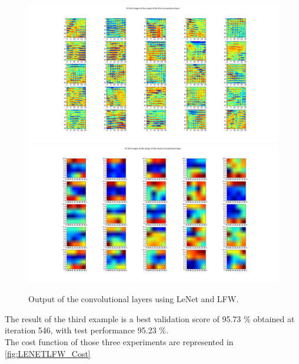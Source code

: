 \begin{figure}[htb]
\centering
\includegraphics[width=1.4\textwidth]{images/LFW_layers/conv_0_out.png}
\includegraphics[width=1.4\textwidth]{images/LFW_layers/conv_1_out.png}
\caption{Output of the convolutional layers using LeNet and LFW.} \label{fig:LENETLFW_ker4}
\end{figure}

The result of the third example is a best validation score of 95.73 \% obtained at iteration 546, with test performance 95.23 \%. \\

The cost function of those three experiments are represented in \ref{fig:LENETLFW_Cost}

